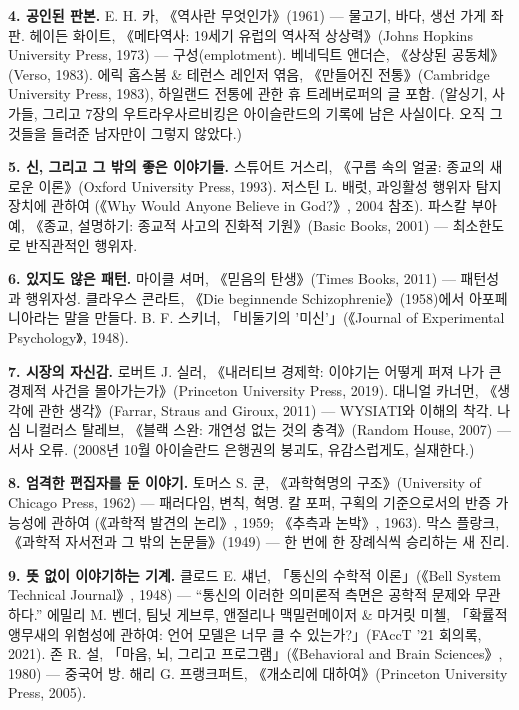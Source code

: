 \textbf{4. 공인된 판본.} E. H. 카, 《역사란 무엇인가》(1961) — 물고기, 바다, 생선 가게 좌판. 헤이든 화이트, 《메타역사: 19세기 유럽의 역사적 상상력》(Johns Hopkins University Press, 1973) — 구성(emplotment). 베네딕트 앤더슨, 《상상된 공동체》(Verso, 1983). 에릭 홉스봄 \& 테런스 레인저 엮음, 《만들어진 전통》(Cambridge University Press, 1983), 하일랜드 전통에 관한 휴 트레버로퍼의 글 포함. (알싱기, 사가들, 그리고 7장의 우트라우사르비킹은 아이슬란드의 기록에 남은 사실이다. 오직 그것들을 들려준 남자만이 그렇지 않았다.)

\textbf{5. 신, 그리고 그 밖의 좋은 이야기들.} 스튜어트 거스리, 《구름 속의 얼굴: 종교의 새로운 이론》(Oxford University Press, 1993). 저스틴 L. 배럿, 과잉활성 행위자 탐지 장치에 관하여 (《Why Would Anyone Believe in God?》, 2004 참조). 파스칼 부아예, 《종교, 설명하기: 종교적 사고의 진화적 기원》(Basic Books, 2001) — 최소한도로 반직관적인 행위자.

\textbf{6. 있지도 않은 패턴.} 마이클 셔머, 《믿음의 탄생》(Times Books, 2011) — 패턴성과 행위자성. 클라우스 콘라트, 《Die beginnende Schizophrenie》(1958)에서 아포페니아라는 말을 만들다. B. F. 스키너, 「비둘기의 '미신'」(《Journal of Experimental Psychology》, 1948).

\textbf{7. 시장의 자신감.} 로버트 J. 실러, 《내러티브 경제학: 이야기는 어떻게 퍼져 나가 큰 경제적 사건을 몰아가는가》(Princeton University Press, 2019). 대니얼 카너먼, 《생각에 관한 생각》(Farrar, Straus and Giroux, 2011) — WYSIATI와 이해의 착각. 나심 니컬러스 탈레브, 《블랙 스완: 개연성 없는 것의 충격》(Random House, 2007) — 서사 오류. (2008년 10월 아이슬란드 은행권의 붕괴도, 유감스럽게도, 실재한다.)

\textbf{8. 엄격한 편집자를 둔 이야기.} 토머스 S. 쿤, 《과학혁명의 구조》(University of Chicago Press, 1962) — 패러다임, 변칙, 혁명. 칼 포퍼, 구획의 기준으로서의 반증 가능성에 관하여 (《과학적 발견의 논리》, 1959; 《추측과 논박》, 1963). 막스 플랑크, 《과학적 자서전과 그 밖의 논문들》(1949) — 한 번에 한 장례식씩 승리하는 새 진리.

\textbf{9. 뜻 없이 이야기하는 기계.} 클로드 E. 섀넌, 「통신의 수학적 이론」(《Bell System Technical Journal》, 1948) — ``통신의 이러한 의미론적 측면은 공학적 문제와 무관하다.'' 에밀리 M. 벤더, 팀닛 게브루, 앤절리나 맥밀런메이저 \& 마거릿 미첼, 「확률적 앵무새의 위험성에 관하여: 언어 모델은 너무 클 수 있는가?」(FAccT '21 회의록, 2021). 존 R. 설, 「마음, 뇌, 그리고 프로그램」(《Behavioral and Brain Sciences》, 1980) — 중국어 방. 해리 G. 프랭크퍼트, 《개소리에 대하여》(Princeton University Press, 2005).


